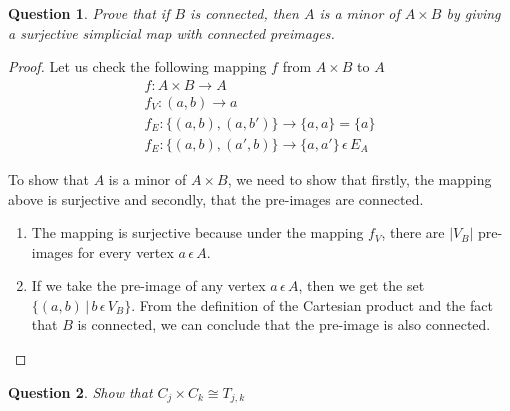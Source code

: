 \documentclass{article}
\newtheorem{question}{Question}
\begin{document}
\begin{question}
    Prove that if $B$ is connected, then $A$ is a minor of $A\times B$ by giving a surjective simplicial map with connected preimages. 
\end{question}

\begin{proof}
    Let us check the following mapping $f$ from $A \times B$ to $A$
  \begin{gather*}
      f: A \times B \rightarrow A \\
      f_V: (a, b) \rightarrow a \\
      f_E: \{ (a,b), (a,b') \} \rightarrow \{a, a\} = \{a\} \\
      f_E: \{ (a,b), (a',b) \} \rightarrow \{a, a'\} \hspace{2pt}  \epsilon \hspace{2pt} E_A
    \end{gather*}
    
    To show that $A$ is a minor of $A \times B$, we need to show that firstly, the mapping above is surjective and secondly, that the pre-images are connected.
    \begin{enumerate}
        \item The mapping is surjective because under the mapping $f_V$, there are $|V_B|$ pre-images for every vertex $a \hspace{2pt} \epsilon  \hspace{2pt}A$.
        \item If we take the pre-image of any vertex $a \hspace{2pt} \epsilon \hspace{2pt} A$, then we get the set
    $\{ (a,b) \hspace{2pt}|\hspace{2pt} b \hspace{2pt} \epsilon \hspace{2pt} V_B \}$. From the definition of the Cartesian product and the fact that $B$ is connected, we can conclude that the pre-image is also connected.
    \end{enumerate}
    
\end{proof}


\begin{question}
    Show that $C_j \times C_k \cong T_{j,k}$
\end{question}
\end{document}
